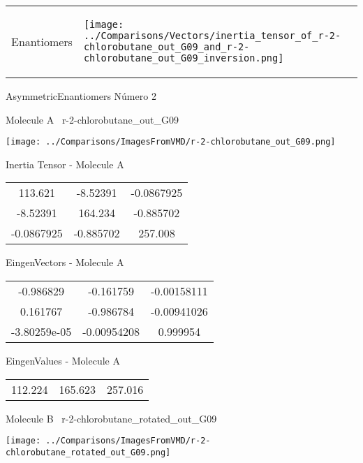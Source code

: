 \vtab[-5mm]
\begin{tabular}{*{2}{m{}}}
\begin{center}
\textcolor{NavyBlue}{\Large Enantiomers}
\end{center}
&
\begin{center}
\texttt{[image: ../Comparisons/Vectors/inertia\_tensor\_of\_r-2-chlorobutane\_out\_G09\_and\_r-2-chlorobutane\_out\_G09\_inversion.png]}
\end{center}
\end{tabular}

 \newpage

\vtab[-3cm]
\begin{center}
{\large AsymmetricEnantiomers \tab Número 2}
\end{center}
\begin{multicols}{2}
\begin{center}

Molecule A \
r-2-chlorobutane\_out\_G09

\texttt{[image: ../Comparisons/ImagesFromVMD/r-2-chlorobutane\_out\_G09.png]}

Inertia Tensor - Molecule A \\
\begin{tabular}{|c c c|}
113.621	 & 	-8.52391	 & 	-0.0867925	 \\
-8.52391	 & 	164.234	 & 	-0.885702	 \\
-0.0867925	 & 	-0.885702	 & 	257.008
\end{tabular}

\vtab
 EingenVectors - Molecule A     \\
\begin{tabular}{|c c c|}
-0.986829	 & 	-0.161759	 & 	-0.00158111	 \\
0.161767	 & 	-0.986784	 & 	-0.00941026	 \\
-3.80259e-05	 & 	-0.00954208	 & 	0.999954
\end{tabular}

\vtab
 EingenValues - Molecule A     \\
\begin{tabular}{|c c c|}
112.224	 & 	165.623	 & 	257.016	 \\
\end{tabular}
\columnbreak

Molecule B \
r-2-chlorobutane\_rotated\_out\_G09

\texttt{[image: ../Comparisons/ImagesFromVMD/r-2-chlorobutane\_rotated\_out\_G09.png]}


\end{center}
\end{multicols}
